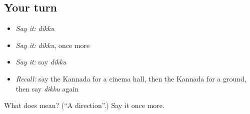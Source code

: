 \subsection*{Your turn}
\begin{itemize}
\raggedright
  \item \emph{Say it:} \emph{dikku}
  \item \emph{Say it:} \emph{dikku}, once more
  \item \emph{Say it:} say \emph{dikku}
  \item \emph{Recall:} say the Kannada for a cinema hall, then the Kannada for a ground, then say \emph{dikku} again
\end{itemize}

\begin{tcolorbox}[breakable,colback=teal!4,colframe=teal!35!black,title={Before you move on}]
What does  mean? (\textquotedblleft{}A direction\textquotedblright{}.) Say it once more.
\end{tcolorbox}
